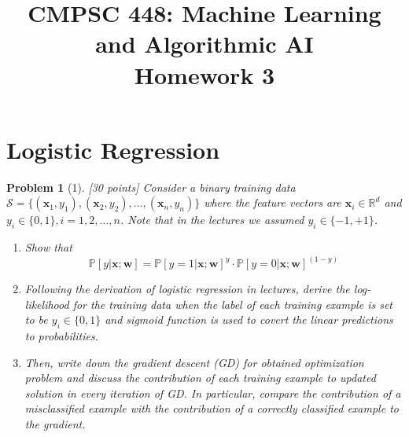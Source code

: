 \documentclass[11pt]{article}
\title{CMPSC 448: Machine Learning and Algorithmic AI \\ Homework 3}
\author{}
\date{}
\theoremstyle{quest}
\newtheorem*{problem}{Problem}
\begin{document}
\maketitle

\section*{Logistic Regression}
\begin{problem}[1] [30 points]
Consider a binary training data $\mathcal{S} = \{(\bm{x}_{1}, y_1),(\bm{x}_{2}, y_2),\dots,(\bm{x}_{n}, y_n)\}$ where the feature vectors are $\bm{x}_{i} \in \mathbb{R}^{d} $ and $y_i \in \{0, 1\}, i=1,2,\dots,n$. Note that in the lectures we assumed $y_i \in \{-1, +1\}$.

\begin{enumerate}
    \item Show that
    \begin{equation}
        \mathbb{P}[y|\bm{x};\bm{w}] = \mathbb{P}[y=1|\bm{x};\bm{w}]^{y} \cdot \mathbb{P}[y=0|\bm{x};\bm{w}]^{(1-y)}
    \end{equation}
    \item Following the derivation of logistic regression in lectures, derive the log-likelihood for the training data when the label of each training example is set to be $y_i \in \{0, 1\}$ and sigmoid function is used to covert the linear predictions to probabilities.
    \item Then, write down the gradient descent (GD) for obtained optimization problem and discuss the contribution of each training example to updated solution in every iteration of GD. In particular, compare the contribution of a misclassified example with the contribution of a correctly classified example to the gradient.
\end{enumerate}

\end{problem}
\end{document}
